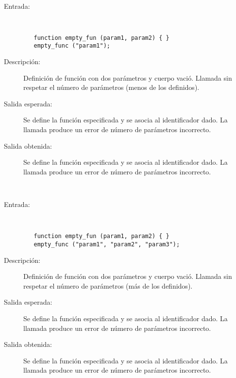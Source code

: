 \hfil \\
	\begin{description}
		\item [Entrada:] \hfill \\
\begin{lstlisting}
   function empty_fun (param1, param2) { } 
   empty_func ("param1");
\end{lstlisting}
		\item [Descripción:] Definición de función con dos parámetros y cuerpo vació. Llamada sin respetar el número de parámetros (menos de los definidos). 
		\item [Salida esperada:] Se define la función especificada y se asocia al identificador dado. La llamada produce un error de número de parámetros incorrecto. 
		\item [Salida obtenida:] Se define la función especificada y se asocia al identificador dado. La llamada produce un error de número de parámetros incorrecto.
	\end{description}
\hfil \\
	\begin{description}
		\item [Entrada:] \hfill \\
\begin{lstlisting}
   function empty_fun (param1, param2) { } 
   empty_func ("param1", "param2", "param3");
\end{lstlisting}
		\item [Descripción:] Definición de función con dos parámetros y cuerpo vació. Llamada sin respetar el número de parámetros (más de los definidos). 
		\item [Salida esperada:] Se define la función especificada y se asocia al identificador dado. La llamada produce un error de número de parámetros incorrecto. 
		\item [Salida obtenida:] Se define la función especificada y se asocia al identificador dado. La llamada produce un error de número de parámetros incorrecto.
	\end{description}
\hfil \\
